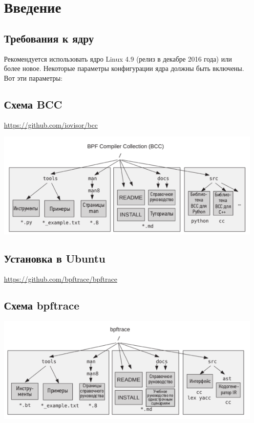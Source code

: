 \section{Введение}

\subsection{Требования к ядру}
Рекомендуется использовать ядро Linux 4.9 (релиз в декабре 2016 года) или более
новое. Некоторые параметры конфигурации ядра должны быть включены.
Вот эти параметры: \\

\subsection{Схема BCC}
\url{https://github.com/iovisor/bcc}

\includegraphics[width=0.8\linewidth]{structure_bcc.png}


\subsection{Установка в Ubuntu}

\url{https://github.com/bpftrace/bpftrace}

\subsection{Схема bpftrace}
\includegraphics[width=1.0\linewidth]{structure_bpftrace.png}
